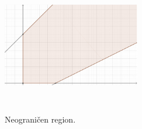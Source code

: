\documentclass[a4paper, utf8, 11pt, colorlinks]{article}
\begin{document}
\begin{figure}[!ht]
    \centering
    \includegraphics[width=170pt,height=170pt]{unbounded-example-solve.eps}
    \caption{Neograničen region.}
    \label{fig:unbounded-example-solve}
\end{figure}
\end{document}
